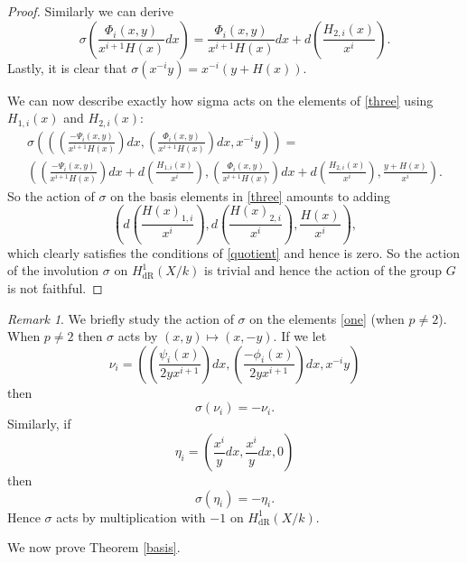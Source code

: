 \documentclass[draft, 11pt]{article} %
\theoremstyle{plain}
\theoremstyle{remark}
\newtheorem*{rem}{Remark}
\newcommand{\derhamhone}{H_{\text {dR}}^1(X/k)}
\begin{document}
\begin{proof}
Similarly we can derive
\begin{equation*}
\sigma \left( \frac{\Phi_i(x,y)}{x^{i+1}H(x)} dx \right)  = \frac{\Phi_i(x,y)}{x^{i+1}H(x)} dx + d \left( \frac{H_{2,i}(x)}{x^i} \right).
\end{equation*}
Lastly, it is clear that $\sigma(x^{-i}y) = x^{-i}(y+H(x))$.


We can now describe exactly how sigma acts on the elements of \eqref{three} using $H_{1,i}(x)$ and $H_{2,i}(x)$:
\begin{multline*}
\sigma \left( \left( \left(\frac{-\Psi_i(x,y)}{x^{i+1}H(x)}\right) dx, \left( \frac{\Phi_i(x,y)}{x^{i+1}H(x)} \right) dx, x^{-i}y \right)\right) = \\
 \left( \left(\frac{-\Psi_i(x,y)}{x^{i+1}H(x)} \right) dx + d\left(\frac{H_{1,i}(x)}{x^i}\right),  \left( \frac{\Phi_i(x,y)}{x^{i+1}H(x)} \right) dx+ d\left(\frac{H_{2,i}(x)}{x^i} \right), \frac{y+H(x)}{x^i} \right).
\end{multline*}
So the action of $\sigma$ on the basis elements in \eqref{three} amounts to adding 
\[
\left( d\left(\frac{H(x)_{1,i}}{x^i}\right), d\left(\frac{H(x)_{2,i}}{x^i}\right), \frac{H(x)}{x^i} \right),
\]
which clearly satisfies the conditions of \eqref{quotient} and hence is zero.
So the action of the involution $\sigma$ on $\derhamhone$ is trivial and hence the action of the group $G$ is not faithful.
\end{proof}

\begin{rem}
We briefly study the action of $\sigma$ on the elements \eqref{one} (when $p\neq 2$).
When $p \neq 2$ then $\sigma$ acts by $(x,y) \mapsto (x,-y)$.
If we let
\[
\nu_i = \left( \left( \frac{\psi_i(x)}{2yx^{i+1}}\right) dx, \left(\frac{-\phi_i(x)}{2yx^{i+1}}\right) dx, x^{-i}y\right)
\]
then 
\begin{equation*}
\sigma(\nu_i) = -\nu_i.
\end{equation*}
Similarly, if 
\[
\eta_i = \left( \frac{x^i}{y}dx, \frac{x^i}{y}dx, 0 \right)
\]
then 
\[
\sigma(\eta_i) = - \eta_i.
\]
Hence $\sigma$ acts by multiplication with $-1$ on $\derhamhone$.
\end{rem}


We now prove Theorem \ref{basis}.
\end{document}
